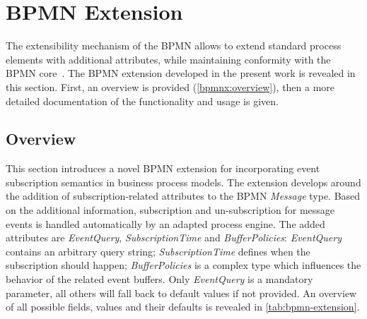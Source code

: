 \section{BPMN Extension}\label{ch:bpmnx}


The extensibility mechanism of the \ac{BPMN} allows to extend standard process elements with additional attributes, while maintaining conformity with the BPMN core~\cite[p.\,44]{bpmnspec}.
The BPMN extension developed in the present work is revealed in this section. First, an overview is provided (\autoref{bpmnx:overview}), then a more detailed documentation of the functionality and usage is given.

\subsection{Overview}\label{bpmnx:overview}
This section introduces a novel BPMN extension for incorporating event subscription semantics in business process models.
The extension develops around the addition of subscription-related attributes to the BPMN \textit{Message} type. Based on the additional information, subscription and un-subscription for message events is handled automatically by an adapted process engine.
The added attributes are \textit{EventQuery}, \textit{SubscriptionTime} and \textit{BufferPolicies}:
\textit{EventQuery} contains an arbitrary query string; \textit{SubscriptionTime} defines when the subscription should happen; \textit{BufferPolicies} is a complex type which influences the behavior of the related event buffers.
Only \textit{EventQuery} is a mandatory parameter, all others will fall back to default values if not provided.
An overview of all possible fields, values and their defaults is revealed in \autoref{tab:bpmn-extension}.


